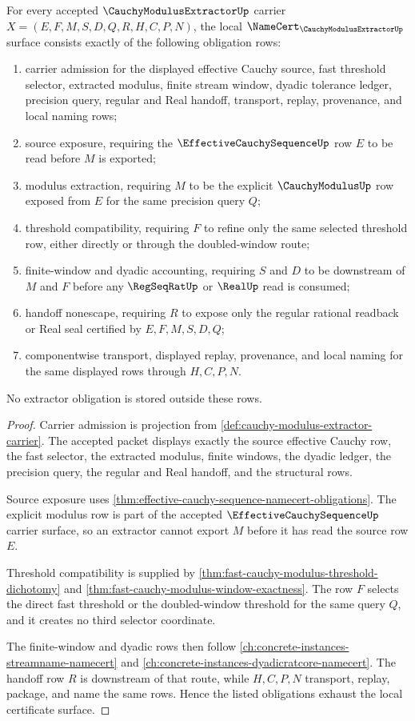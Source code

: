 \begin{theorem}\label{thm:cauchy-modulus-extractor-namecert-obligations}
For every accepted $\CauchyModulusExtractorUp$ carrier $X=(E,F,M,S,D,Q,R,H,C,P,N)$, the local $\NameCert_{\CauchyModulusExtractorUp}$ surface consists exactly of the following obligation rows:
\begin{enumerate}
\item carrier admission for the displayed effective Cauchy source, fast threshold selector, extracted modulus, finite stream window, dyadic tolerance ledger, precision query, regular and Real handoff, transport, replay, provenance, and local naming rows;
\item source exposure, requiring the $\EffectiveCauchySequenceUp$ row $E$ to be read before $M$ is exported;
\item modulus extraction, requiring $M$ to be the explicit $\CauchyModulusUp$ row exposed from $E$ for the same precision query $Q$;
\item threshold compatibility, requiring $F$ to refine only the same selected threshold row, either directly or through the doubled-window route;
\item finite-window and dyadic accounting, requiring $S$ and $D$ to be downstream of $M$ and $F$ before any $\RegSeqRatUp$ or $\RealUp$ read is consumed;
\item handoff nonescape, requiring $R$ to expose only the regular rational readback or Real seal certified by $E,F,M,S,D,Q$;
\item componentwise transport, displayed replay, provenance, and local naming for the same displayed rows through $H,C,P,N$.
\end{enumerate}
No extractor obligation is stored outside these rows.
\end{theorem}
\begin{proof}
Carrier admission is projection from \autoref{def:cauchy-modulus-extractor-carrier}. The accepted packet displays exactly the source effective Cauchy row, the fast selector, the extracted modulus, finite windows, the dyadic ledger, the precision query, the regular and Real handoff, and the structural rows.

Source exposure uses \autoref{thm:effective-cauchy-sequence-namecert-obligations}. The explicit modulus row is part of the accepted $\EffectiveCauchySequenceUp$ carrier surface, so an extractor cannot export $M$ before it has read the source row $E$.

Threshold compatibility is supplied by \autoref{thm:fast-cauchy-modulus-threshold-dichotomy} and \autoref{thm:fast-cauchy-modulus-window-exactness}. The row $F$ selects the direct fast threshold or the doubled-window threshold for the same query $Q$, and it creates no third selector coordinate.

The finite-window and dyadic rows then follow \autoref{ch:concrete-instances-streamname-namecert} and \autoref{ch:concrete-instances-dyadicratcore-namecert}. The handoff row $R$ is downstream of that route, while $H,C,P,N$ transport, replay, package, and name the same rows. Hence the listed obligations exhaust the local certificate surface.
\end{proof}

